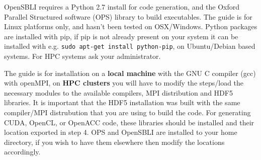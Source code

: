 \documentclass[11pt]{article}
\begin{document}
\maketitle

OpenSBLI requires a Python 2.7 install for code generation, and the Oxford Parallel Structured software (OPS) library to build executables. The guide is for Linux platforms only, and hasn't been tested on OSX/Windows. Python packages are installed with pip, if pip is not already present on your system it can be installed with e.g. \verb|sudo apt-get install python-pip|, on Ubuntu/Debian based systems. For HPC systems ask your administrator. 

The guide is for installation on a \textbf{local machine} with the GNU C compiler (gcc) with openMPI, on \textbf{HPC clusters} you will have to modify the steps/load the necessary modules to the available compilers, MPI distribution and HDF5 libraries. It is important that the HDF5 installation was built with the same compiler/MPI distrubution that you are using to build the code. For generating CUDA, OpenCL, or OpenACC code, these libraries should be installed and their location exported in step 4. OPS and OpenSBLI are installed to your home directory, if you wish to have them elsewhere then modify the locations accordingly.
\end{document}
